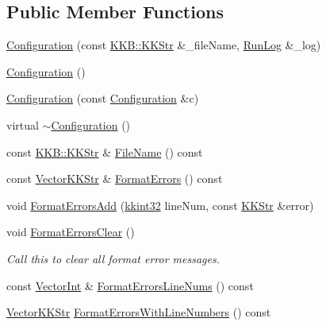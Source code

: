 \subsection*{Public Member Functions}
\begin{DoxyCompactItemize}
\item 
\hyperlink{class_k_k_b_1_1_configuration_a48bb1e7f0341f8e68b03f414d26d05e1}{Configuration} (const \hyperlink{class_k_k_b_1_1_k_k_str}{K\+K\+B\+::\+K\+K\+Str} \&\+\_\+file\+Name, \hyperlink{class_k_k_b_1_1_run_log}{Run\+Log} \&\+\_\+log)
\item 
\hyperlink{class_k_k_b_1_1_configuration_a779947337bf652f0e773cb29f37f14ba}{Configuration} ()
\item 
\hyperlink{class_k_k_b_1_1_configuration_a74cdde9cb4da23a8091dc09accd7289e}{Configuration} (const \hyperlink{class_k_k_b_1_1_configuration}{Configuration} \&c)
\item 
virtual \hyperlink{class_k_k_b_1_1_configuration_a0dd0fa189e239f4c9a036303f641441e}{$\sim$\+Configuration} ()
\item 
const \hyperlink{class_k_k_b_1_1_k_k_str}{K\+K\+B\+::\+K\+K\+Str} \& \hyperlink{class_k_k_b_1_1_configuration_a257e3c439e437688bbdd0d8f1c96f55c}{File\+Name} () const 
\item 
const \hyperlink{class_k_k_b_1_1_vector_k_k_str}{Vector\+K\+K\+Str} \& \hyperlink{class_k_k_b_1_1_configuration_a4edb0593552fbf5bfe096c611641525a}{Format\+Errors} () const 
\item 
void \hyperlink{class_k_k_b_1_1_configuration_aa8b2de567d8904c3643b8802b14cd443}{Format\+Errors\+Add} (\hyperlink{namespace_k_k_b_a8fa4952cc84fda1de4bec1fbdd8d5b1b}{kkint32} line\+Num, const \hyperlink{class_k_k_b_1_1_k_k_str}{K\+K\+Str} \&error)
\item 
void \hyperlink{class_k_k_b_1_1_configuration_a2ec3b84f15094ea8f190a15b4659607a}{Format\+Errors\+Clear} ()
\begin{DoxyCompactList}\small\item\em Call this to clear all format error messages. \end{DoxyCompactList}\item 
const \hyperlink{namespace_k_k_b_a791ebe73f89917067a7aab9dbd817e45}{Vector\+Int} \& \hyperlink{class_k_k_b_1_1_configuration_a891bf146ec6cb866850c0a8c45487e97}{Format\+Errors\+Line\+Nums} () const 
\item 
\hyperlink{class_k_k_b_1_1_vector_k_k_str}{Vector\+K\+K\+Str} \hyperlink{class_k_k_b_1_1_configuration_ace869c5caf1a0e717895635b7f592dba}{Format\+Errors\+With\+Line\+Numbers} () const 

\end{DoxyCompactItemize}
